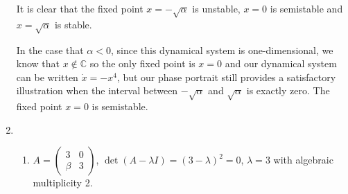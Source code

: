 \documentclass[10pt]{article}
\begin{document}
\begin{enumerate}
      \bigskip
      \bigskip
      \bigskip
      \bigskip
      \bigskip
      \bigskip
      \bigskip
      \bigskip

      It is clear that the fixed point $x = -\sqrt{\alpha}$ is unstable, $x =
      0$ is semistable and $x = \sqrt{\alpha}$ is stable.

      In the case that $\alpha < 0$, since this dynamical system is
      one-dimensional, we know that $x \not \in \mathbb{C}$ so the only fixed
      point is $x = 0$ and our dynamical system can be written $\dot x = -x^4$,
      but our phase portrait still provides a satisfactory illustration when
      the interval between $-\sqrt{\alpha}$ and $\sqrt{\alpha}$ is exactly
      zero. The fixed point $x = 0$ is semistable.


      \item
        \begin{enumerate}
          \item $A = \begin{pmatrix} 3 & 0 \\ \beta & 3 \end{pmatrix}$, $\det(A
              - \lambda I) = (3 - \lambda)^2 = 0$, $\lambda = 3$ with algebraic
              multiplicity 2.


\end{enumerate}
\end{enumerate}
\end{document}

